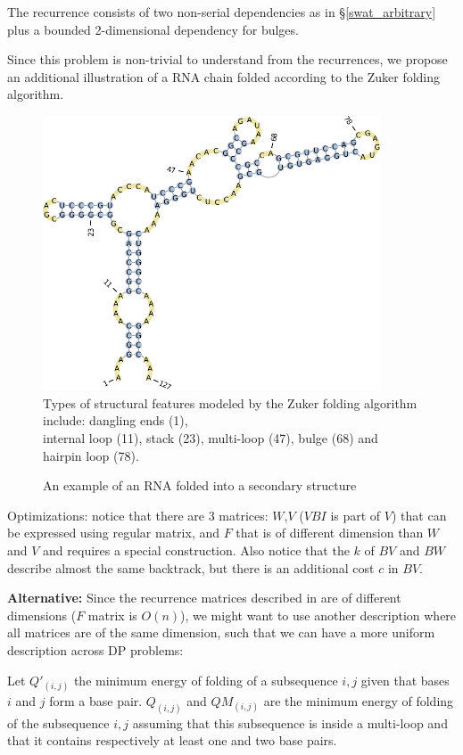 The recurrence consists of two non-serial dependencies as in \S\ref{swat_arbitrary} plus a bounded 2-dimensional dependency for bulges.

\newpage
Since this problem is non-trivial to understand from the recurrences, we propose an additional illustration of a RNA chain folded according to the Zuker folding algorithm.
\begin{figure}[H]\begin{center}
\includegraphics[width=10cm]{inc/zuker_struct.pdf} \\
\small Types of structural features modeled by the Zuker folding algorithm include: dangling ends (1), \\ internal loop (11), stack (23), multi-loop (47), bulge (68) and hairpin loop (78).\end{center}\caption{An example of an RNA folded into a secondary structure}\end{figure}

\item Optimizations: notice that there are 3 matrices: $W$,$V$ ($VBI$ is part of $V$) that can be expressed using regular matrix, and $F$ that is of different dimension than $W$ and $V$ and requires a special construction. Also notice that the $k$ of $BV$ and $BW$ describe almost the same backtrack, but there is an additional cost $c$ in $BV$.
\ole

\textbf{Alternative:} Since the recurrence matrices described in \cite{para_dprec} are of different dimensions ($F$ matrix is $O(n)$), we might want to use another description \cite{gpu_rnafold} where all matrices are of the same dimension, such that we can have a more uniform description across DP problems:

Let $Q'_{(i,j)}$ the minimum energy of folding of a subsequence $i,j$ given that bases $i$ and $j$ form a base pair. $Q_{(i,j)}$ and $QM_{(i,j)}$ are the minimum energy of folding of the subsequence $i,j$ assuming that this subsequence is inside a multi-loop and that it contains respectively at least one and two base pairs.

